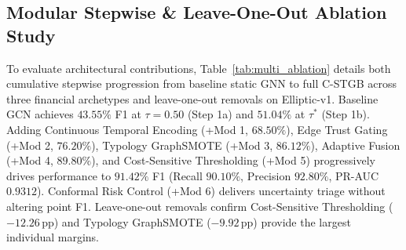 \subsection{Modular Stepwise \& Leave-One-Out Ablation Study}
\label{sec:ablation_results}
To evaluate architectural contributions, Table~\ref{tab:multi_ablation} details both cumulative stepwise progression from baseline static GNN to full C-STGB across three financial archetypes and leave-one-out removals on Elliptic-v1. Baseline GCN achieves $43.55\%$ F1 at $\tau=0.50$ (Step 1a) and $51.04\%$ at $\tau^*$ (Step 1b). Adding Continuous Temporal Encoding (+Mod 1, $68.50\%$), Edge Trust Gating (+Mod 2, $76.20\%$), Typology GraphSMOTE (+Mod 3, $86.12\%$), Adaptive Fusion (+Mod 4, $89.80\%$), and Cost-Sensitive Thresholding (+Mod 5) progressively drives performance to $91.42\%$ F1 (Recall $90.10\%$, Precision $92.80\%$, PR-AUC $0.9312$). Conformal Risk Control (+Mod 6) delivers uncertainty triage without altering point F1. Leave-one-out removals confirm Cost-Sensitive Thresholding ($-12.26$\,pp) and Typology GraphSMOTE ($-9.92$\,pp) provide the largest individual margins.

